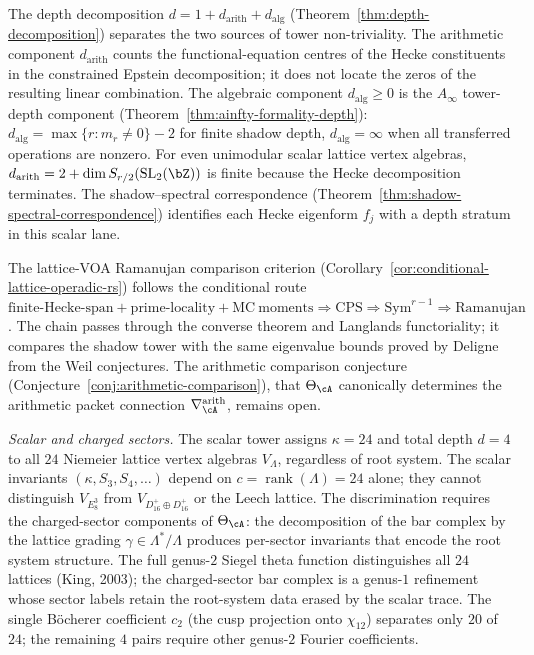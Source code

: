The depth decomposition
$d = 1 + d_{\mathrm{arith}} + d_{\mathrm{alg}}$
(Theorem~\ref{thm:depth-decomposition}) separates the
two sources of tower non-triviality.
The arithmetic component $d_{\mathrm{arith}}$
counts the functional-equation centres of the Hecke constituents in
the constrained Epstein decomposition; it does not locate the zeros
of the resulting linear combination. The algebraic component
$d_{\mathrm{alg}} \ge 0$
is the $A_\infty$ tower-depth component
(Theorem~\ref{thm:ainfty-formality-depth}):
$d_{\mathrm{alg}} = \max\{r : m_r \ne 0\} - 2$ for finite
shadow depth, $d_{\mathrm{alg}} = \infty$ when all
transferred operations are nonzero. For even unimodular scalar
lattice vertex algebras,
$d_{\mathrm{arith}} = 2 + \dim S_{r/2}(\mathrm{SL}_2(\bZ))$ is finite
because the Hecke decomposition terminates. The shadow--spectral
correspondence
(Theorem~\ref{thm:shadow-spectral-correspondence})
identifies each Hecke eigenform $f_j$ with a depth stratum in this
scalar lane.

The lattice-VOA Ramanujan comparison criterion
(Corollary~\ref{cor:conditional-lattice-operadic-rs}) follows the conditional
route
$\text{finite-Hecke-span}+\text{prime-locality}+\mathrm{MC\ moments}
 \Rightarrow \text{CPS} \Rightarrow \mathrm{Sym}^{r-1}
 \Rightarrow \text{Ramanujan}$.
The chain passes through the converse theorem and Langlands
functoriality; it compares the shadow tower with the same eigenvalue
bounds proved by Deligne from the Weil conjectures.
The arithmetic comparison conjecture
(Conjecture~\ref{conj:arithmetic-comparison}), that
$\Theta_\cA$ canonically determines the arithmetic packet
connection $\nabla^{\mathrm{arith}}_\cA$, remains open.

\smallskip
\noindent\emph{Scalar and charged sectors.}\;
The scalar tower assigns $\kappa = 24$ and
total depth $d = 4$ to all $24$ Niemeier lattice
vertex algebras $V_\Lambda$, regardless of root system.
The scalar invariants $(\kappa, S_3, S_4, \ldots)$ depend
on $c = \operatorname{rank}(\Lambda) = 24$ alone; they
cannot distinguish $V_{E_8^3}$ from
$V_{D_{16}^+ \oplus D_{16}^+}$ or the Leech lattice.
The discrimination requires the charged-sector
components of $\Theta_\cA$: the decomposition of the
bar complex by the lattice grading
$\gamma \in \Lambda^*/\Lambda$ produces per-sector
invariants that encode the root system structure.
The full genus-$2$ Siegel theta function distinguishes all
$24$ lattices (King, 2003);
the charged-sector bar complex is a genus-$1$ refinement whose
sector labels retain the root-system data erased by the scalar trace.
The single B\"ocherer coefficient $c_2$
(the cusp projection onto $\chi_{12}$)
separates only $20$ of $24$; the remaining $4$ pairs
require other genus-$2$ Fourier coefficients.

